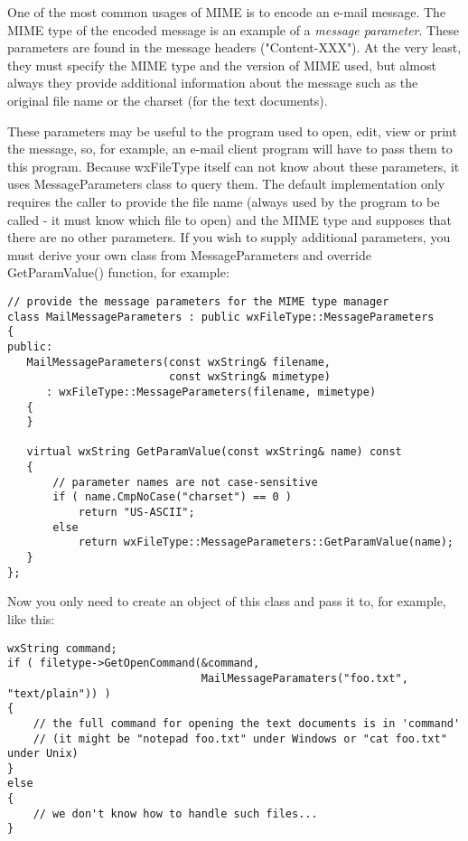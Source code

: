 \label{wxfiletypemessageparameters}

One of the most common usages of MIME is to encode an e-mail message. The MIME
type of the encoded message is an example of a {\it message parameter}. These
parameters are found in the message headers ("Content-XXX"). At the very least,
they must specify the MIME type and the version of MIME used, but almost always
they provide additional information about the message such as the original file
name or the charset (for the text documents).

These parameters may be useful to the program used to open, edit, view or print
the message, so, for example, an e-mail client program will have to pass them to
this program. Because wxFileType itself can not know about these parameters,
it uses MessageParameters class to query them. The default implementation only
requires the caller to provide the file name (always used by the program to be
called - it must know which file to open) and the MIME type and supposes that
there are no other parameters. If you wish to supply additional parameters, you
must derive your own class from MessageParameters and override GetParamValue()
function, for example:

\begin{verbatim}
// provide the message parameters for the MIME type manager
class MailMessageParameters : public wxFileType::MessageParameters
{
public:
   MailMessageParameters(const wxString& filename,
                         const wxString& mimetype)
      : wxFileType::MessageParameters(filename, mimetype)
   {
   }

   virtual wxString GetParamValue(const wxString& name) const
   {
       // parameter names are not case-sensitive
       if ( name.CmpNoCase("charset") == 0 )
           return "US-ASCII";
       else
           return wxFileType::MessageParameters::GetParamValue(name);
   }
};
\end{verbatim}

Now you only need to create an object of this class and pass it to, for example,
\rtfsp{} like this:

\begin{verbatim}
wxString command;
if ( filetype->GetOpenCommand(&command,
                              MailMessageParamaters("foo.txt", "text/plain")) )
{
    // the full command for opening the text documents is in 'command'
    // (it might be "notepad foo.txt" under Windows or "cat foo.txt" under Unix)
}
else
{
    // we don't know how to handle such files...
}
\end{verbatim}

